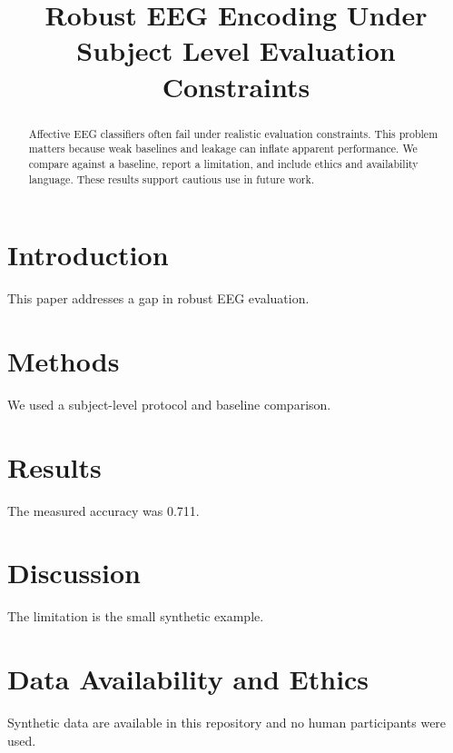 \documentclass{article}
\title{Robust EEG Encoding Under Subject Level Evaluation Constraints}
\begin{document}
\begin{abstract}
Affective EEG classifiers often fail under realistic evaluation constraints. This problem matters because weak baselines and leakage can inflate apparent performance. We compare against a baseline, report a limitation, and include ethics and availability language. These results support cautious use in future work.
\end{abstract}
\section{Introduction}
This paper addresses a gap in robust EEG evaluation.
\section{Methods}
We used a subject-level protocol and baseline comparison.
\section{Results}
The measured accuracy was 0.711.
\section{Discussion}
The limitation is the small synthetic example.
\section{Data Availability and Ethics}
Synthetic data are available in this repository and no human participants were used.
\end{document}
